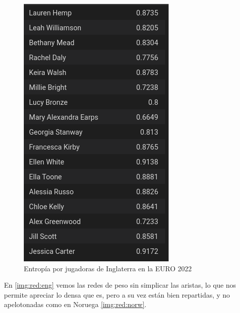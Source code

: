 \begin{figure}[ht!]
  \centering
   \includegraphics[width=\textwidth]{./img/entrop_engl.png}
   \caption{Entropía por jugadoras de Inglaterra en la EURO 2022}
   \label{img:ent:eng}
\end{figure}

En \ref{img:red:eng} vemos las redes de peso sin simplicar las aristas, lo que nos permite apreciar lo densa que es, pero a su 
vez están bien repartidas, y no apelotonadas como en Noruega \ref{img:red:norw}.

